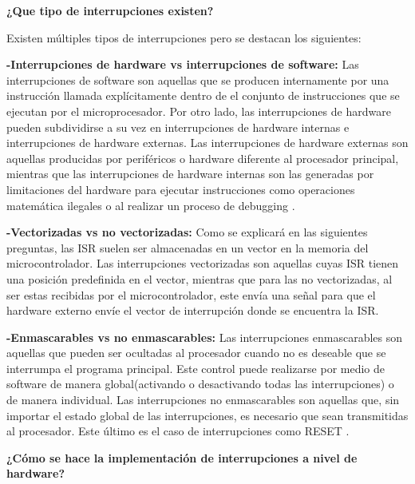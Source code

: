 \documentclass[a4paper,11pt]{article}
\begin{document}
{\large\bfseries ¿Que tipo de interrupciones existen? }

Existen múltiples tipos de interrupciones pero se destacan los siguientes:

{\large\bfseries -Interrupciones de hardware vs interrupciones de software:}
Las interrupciones de software son aquellas que se producen internamente por una instrucción llamada explícitamente dentro de el conjunto de instrucciones que se ejecutan por el microprocesador. Por otro lado, las interrupciones de hardware pueden subdividirse a su vez en interrupciones de hardware internas e interrupciones de hardware externas. Las interrupciones de hardware externas son aquellas producidas por periféricos o hardware diferente al procesador principal, mientras que las interrupciones de hardware internas son las generadas por limitaciones del hardware para ejecutar instrucciones como operaciones matemática ilegales o al realizar un proceso de debugging \cite{labrosse2008embedded}.

{\large\bfseries -Vectorizadas vs no vectorizadas: }
Como se explicará en las siguientes preguntas, las ISR suelen ser almacenadas en un vector en la memoria del microcontrolador. Las interrupciones vectorizadas son aquellas cuyas ISR tienen una posición predefinida en el vector, mientras que para las no vectorizadas, al ser estas recibidas por el microcontrolador, este envía una señal para que el hardware externo envíe el vector de interrupción donde se encuentra la ISR. \cite[p.195]{udayashankara2009microcontroller}

{\large \bfseries -Enmascarables vs no enmascarables: }
Las interrupciones enmascarables son aquellas que pueden ser ocultadas al procesador cuando no es deseable que se interrumpa el programa principal. Este control puede realizarse por medio de software de manera global(activando o desactivando todas las interrupciones) o de manera individual. Las interrupciones no enmascarables son aquellas que, sin importar el estado global de las interrupciones, es necesario que sean transmitidas al procesador. Este último es el caso de interrupciones como RESET \cite[p.11]{susnea2005microcontrollers}.

{\large\bfseries ¿Cómo se hace la implementación de interrupciones a nivel de hardware? } 
\end{document}
